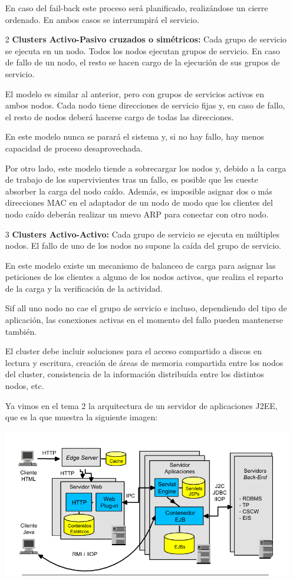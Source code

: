\begin{enumerate}
En caso del fail-back este proceso será planificado, realizándose un cierre ordenado. En ambos casos se interrumpirá el servicio.

\item[2] \textbf{Clusters Activo-Pasivo cruzados o simétricos:} Cada grupo de servicio se ejecuta en un nodo. Todos los nodos ejecutan grupos de servicio. En caso de fallo de un nodo, el resto se hacen cargo de la ejecución de sus grupos de servicio.

El modelo es similar al anterior, pero con grupos de servicios activos en ambos nodos. Cada nodo tiene direcciones de servicio fijas y, en caso de fallo, el resto de nodos deberá hacerse cargo de todas las direcciones.

En este modelo nunca se parará el sistema y, si no hay fallo, hay menos capacidad de proceso desaprovechada.

Por otro lado, este modelo tiende a sobrecargar los nodos y, debido a la carga de trabajo de los supervivientes tras un fallo, es posible que les cueste absorber la carga del nodo caído. Además, es imposible asignar dos o más direcciones MAC en el adaptador de un nodo de modo que los clientes del nodo caído deberán realizar un nuevo ARP para conectar con otro nodo.


\item[3] \textbf{Clusters Activo-Activo:} Cada grupo de servicio se ejecuta en múltiples nodos. El fallo de uno de los nodos no supone la caída del grupo de servicio.

En este modelo existe un mecanismo de balanceo de carga para asignar las peticiones de los clientes a alguno de los nodos activos, que realiza el reparto de la carga y la verificación de la actividad.

Sif all uno nodo no cae el grupo de servicio e incluso, dependiendo del tipo de aplicación, las conexiones activas en el momento del fallo pueden mantenerse también.

El cluster debe incluir soluciones para el acceso compartido a discos en lectura y escritura, creación de áreas de memoria compartida entre los nodos del cluster, consistencia de la información distribuída entre los distintos nodos, etc.

\begin{example}
Ya vimos en el tema 2 la arquitectura de un servidor de aplicaciones J2EE, que es la que muestra la siguiente imagen:
\begin{center}
\includegraphics[width=\linewidth]{img/j2ee.png}
\end{center}


\end{example}
\end{enumerate}
